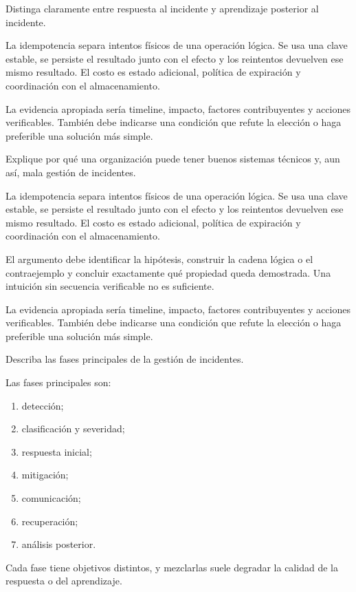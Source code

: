 \documentclass[variant=guia,cover=institutional,mode=screen]{ua-engineering-v6-article}
\begin{document}
\begin{uaexercise}
Distinga claramente entre respuesta al incidente y aprendizaje posterior al incidente.
\end{uaexercise}
\begin{uaanswer}
La idempotencia separa intentos físicos de una operación lógica. Se usa una clave estable, se persiste el resultado junto con el efecto y los reintentos devuelven ese mismo resultado. El costo es estado adicional, política de expiración y coordinación con el almacenamiento.

La evidencia apropiada sería timeline, impacto, factores contribuyentes y acciones verificables. También debe indicarse una condición que refute la elección o haga preferible una solución más simple.
\end{uaanswer}

\begin{uaexercise}
Explique por qué una organización puede tener buenos sistemas técnicos y, aun así, mala gestión de incidentes.
\end{uaexercise}
\begin{uaanswer}
La idempotencia separa intentos físicos de una operación lógica. Se usa una clave estable, se persiste el resultado junto con el efecto y los reintentos devuelven ese mismo resultado. El costo es estado adicional, política de expiración y coordinación con el almacenamiento.

El argumento debe identificar la hipótesis, construir la cadena lógica o el contraejemplo y concluir exactamente qué propiedad queda demostrada. Una intuición sin secuencia verificable no es suficiente.

La evidencia apropiada sería timeline, impacto, factores contribuyentes y acciones verificables. También debe indicarse una condición que refute la elección o haga preferible una solución más simple.
\end{uaanswer}

\begin{uaexercise}
Describa las fases principales de la gestión de incidentes.
\end{uaexercise}
\begin{uaanswer}
Las fases principales son:
\begin{enumerate}
\item detección;
\item clasificación y severidad;
\item respuesta inicial;
\item mitigación;
\item comunicación;
\item recuperación;
\item análisis posterior.
\end{enumerate}

Cada fase tiene objetivos distintos, y mezclarlas suele degradar la calidad de la respuesta o del aprendizaje.
\end{uaanswer}
\end{document}
